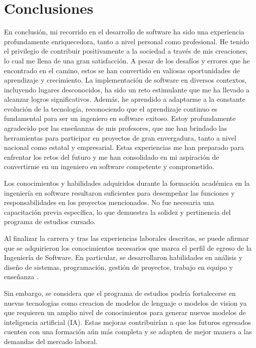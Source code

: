 \documentclass[protocolo.tex]{subfiles}
\begin{document}
\section{Conclusiones}
En conclusión, mi recorrido en el desarrollo de software ha sido una experiencia
profundamente enriquecedora, tanto a nivel personal como profesional. He tenido el
privilegio de contribuir positivamente a la sociedad a través de mis creaciones, lo cual me
llena de una gran satisfacción. A pesar de los desafíos y errores que he encontrado en el
camino, estos se han convertido en valiosas oportunidades de aprendizaje y crecimiento.
La implementación de software en diversos contextos, incluyendo lugares desconocidos, ha
sido un reto estimulante que me ha llevado a alcanzar logros significativos. Además, he
aprendido a adaptarme a la constante evolución de la tecnología, reconociendo que el
aprendizaje continuo es fundamental para ser un ingeniero en software exitoso.
Estoy profundamente agradecido por las enseñanzas de mis profesores, que me han
brindado las herramientas para participar en proyectos de gran envergadura, tanto a nivel
nacional como estatal y empresarial. Estas experiencias me han preparado para enfrentar
los retos del futuro y me han consolidado en mi aspiración de convertirme en un ingeniero
en software competente y comprometido.

Los conocimientos y habilidades adquiridos durante la formación académica en la ingeniería en software resultaron suficientes para desempeñar las funciones y responsabilidades en los proyectos mencionados.  No fue necesaria una capacitación previa específica, lo que demuestra la solidez y pertinencia del programa de estudios cursado.

Al finalizar la carrera y tras las experiencias laborales descritas, se puede afirmar que se  adquirieron los conocimientos necesarios que marca el perfil de egreso de la Ingeniería de Software. En particular, 
se desarrollaron habilidades en análisis y diseño de sistemas, programación, gestión de proyectos, trabajo en equipo y enseñanza .

Sin embargo, se considera que el programa de estudios podría fortalecerse en nuevas tecnologias como creacion de modelos de lenguaje o modelos de vision ya que requieren un amplio nivel de conocimientos para generar nuevos modelos de inteligencia artificial (IA).  Estas mejoras contribuirían a que los futuros egresados cuenten con una formación aún más completa y  se  adapten  de  mejor  manera  a  las  demandas  del  mercado  laboral.
\end{document}
